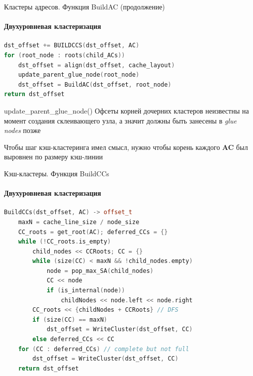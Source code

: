 \begin{frame}[fragile]{Кластеры адресов. Функция BuildAC (продолжение)}
    \framesubtitle{Двухуровневая кластеризация}
    \begin{lstlisting}[language=C++,basicstyle=\ttfamily,keywordstyle=\color{blue}]
dst_offset += BUILDCCS(dst_offset, AC)
for (root_node : roots(child_ACs))
    dst_offset = align(dst_offset, cache_layout)
    update_parent_glue_node(root_node)
    dst_offset = BuildAC(dst_offset, root_node)
return dst_offset
    \end{lstlisting}
    \begin{block}{update\_parent\_glue\_node()}
        Офсеты корней дочерних кластеров неизвестны на момент создания склеивающего узла,
        а значит должны быть занесены в \textit{glue nodes} позже
    \end{block}
    \begin{block}{}
        Чтобы шаг кэш-кластеринга имел смысл, нужно чтобы корень каждого \textbf{AC} был
        выровнен по размеру кэш-линии
    \end{block}
\end{frame}

\begin{frame}[fragile]{Кэш-кластеры. Функция BuildCCs}
    \framesubtitle{Двухуровневая кластеризация}
    \begin{adjustbox}{width=\textwidth, keepaspectratio}
        \begin{lstlisting}[language=C++,basicstyle=\ttfamily,keywordstyle=\color{blue}]
BuildCCs(dst_offset, AC) -> offset_t
    maxN = cache_line_size / node_size
    CC_roots = get_root(AC); deferred_CCs = {}
    while (!CC_roots.is_empty)
        child_nodes << CCRoots; CC = {}
        while (size(CC) < maxN && !child_nodes.empty)
            node = pop_max_SA(child_nodes)
            CC << node
            if (is_internal(node))
                childNodes << node.left << node.right
        CC_roots << {childNodes + CCRoots} // DFS
        if (size(CC) == maxN)
            dst_offset = WriteCluster(dst_offset, CC)
        else deferred_CCs << CC
    for (CC : deferred_CCs) // complete but not full
        dst_offset = WriteCluster(dst_offset, CC)
    return dst_offset
    \end{lstlisting}
\end{adjustbox}
\end{frame}

